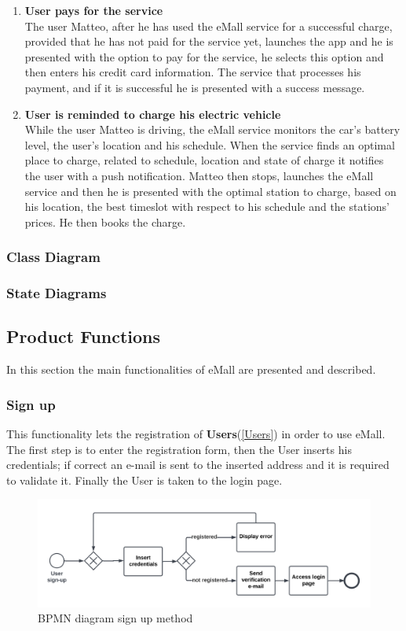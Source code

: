 \begin{enumerate}
    \item \textbf{User pays for the service}\\
    The user Matteo, after he has used the eMall service for a successful charge, provided that he has not paid for the service yet,
    launches the app and he is presented with the option to pay for the service, 
    he selects this option and then enters his credit card information.
    The service that processes his payment, and if it is successful he is presented with a success message.
    \item \textbf{User is reminded to charge his electric vehicle}\\
    While the user Matteo is driving, the eMall service monitors the car's battery level, the user's location and his schedule. 
    When the service finds an optimal place to charge, related to schedule, location and state of charge it notifies the user with a push notification.
    Matteo then stops, launches the eMall service and then he is presented with the optimal station to charge, based on his location, the best timeslot with respect to his schedule and the stations' prices. He then books the charge.
\end{enumerate}
\subsubsection{Class Diagram}

\subsubsection{State Diagrams}
\subsection{Product Functions}
In this section the main functionalities of eMall are presented and described.
\subsubsection{Sign up}
This functionality lets the registration of \textbf{Users}(\ref{Users})  in order to use eMall. The first step is to enter the registration form, then the User inserts his credentials; if correct an e-mail is sent to the inserted address and it is required to validate it. 
Finally the User is taken to the login page.
\begin{figure}[H]
    \begin{center}
        \includegraphics[width=\textwidth]{img/fun-sign-up.png}
        \caption{BPMN diagram sign up method}
    \end{center}
\end{figure}
